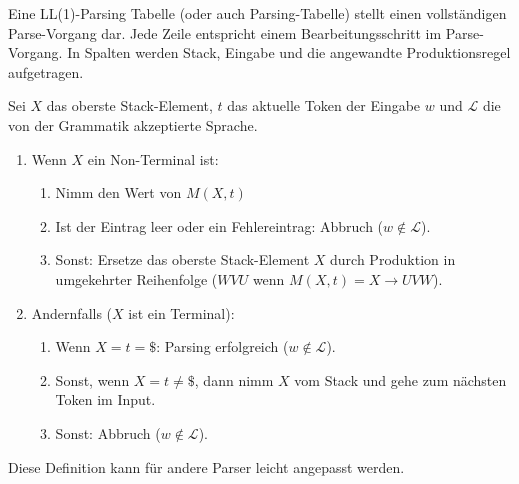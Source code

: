 \begin{defn}
Eine LL(1)-Parsing Tabelle (oder auch Parsing-Tabelle) stellt einen vollständigen Parse-Vorgang dar.
Jede Zeile entspricht einem Bearbeitungsschritt im Parse-Vorgang.
In Spalten werden Stack, Eingabe und die angewandte Produktionsregel aufgetragen.

\begin{algo}
Sei $X$ das oberste Stack-Element, $t$ das aktuelle Token der Eingabe $w$ und $\mathcal{L}$ die von der Grammatik akzeptierte Sprache.
\begin{enumerate}
\item Wenn $X$ ein Non-Terminal ist:
\begin{enumerate}
\item Nimm den Wert von $M(X,t)$
\item Ist der Eintrag leer oder ein Fehlereintrag: Abbruch ($w \not \in \mathcal{L}$).
\item Sonst: Ersetze das oberste Stack-Element $X$ durch Produktion in umgekehrter Reihenfolge ($WVU$ wenn $M(X,t)=X\to UVW$).
\end{enumerate}
\item Andernfalls ($X$ ist ein Terminal):
\begin{enumerate}
\item Wenn $X=t=\$$: Parsing erfolgreich ($w \not \in \mathcal{L}$).
\item Sonst, wenn $X=t\neq\$$, dann nimm $X$ vom Stack und gehe zum nächsten Token im Input.
\item Sonst: Abbruch ($w \not \in \mathcal{L}$).
\end{enumerate}
\end{enumerate}
\end{algo}
\end{defn}

Diese Definition kann für andere Parser leicht angepasst werden.

